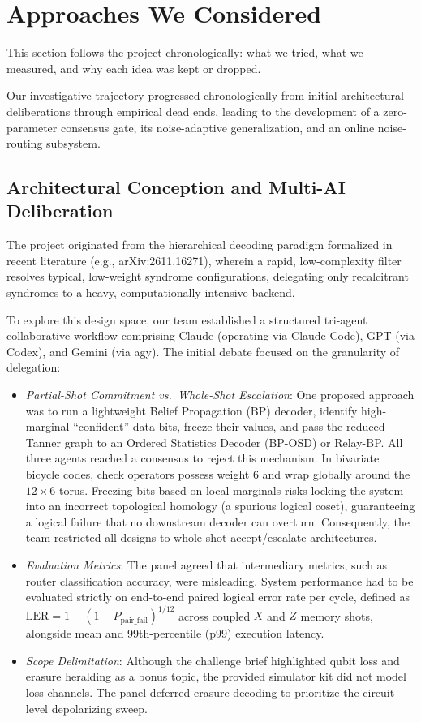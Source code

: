 \section{Approaches We Considered}

This section follows the project chronologically: what we tried, what we measured, and why each idea was kept or dropped.

Our investigative trajectory progressed chronologically from initial architectural deliberations through empirical dead ends, leading to the development of a zero-parameter consensus gate, its noise-adaptive generalization, and an online noise-routing subsystem.

\subsection{Architectural Conception and Multi-AI Deliberation}

The project originated from the hierarchical decoding paradigm formalized in recent literature (e.g., arXiv:2611.16271), wherein a rapid, low-complexity filter resolves typical, low-weight syndrome configurations, delegating only recalcitrant syndromes to a heavy, computationally intensive backend. 

To explore this design space, our team established a structured tri-agent collaborative workflow comprising Claude (operating via Claude Code), GPT (via Codex), and Gemini (via agy). The initial debate focused on the granularity of delegation:
\begin{itemize}
    \item \textit{Partial-Shot Commitment vs.\ Whole-Shot Escalation}: One proposed approach was to run a lightweight Belief Propagation (BP) decoder, identify high-marginal ``confident'' data bits, freeze their values, and pass the reduced Tanner graph to an Ordered Statistics Decoder (BP-OSD) or Relay-BP. All three agents reached a consensus to reject this mechanism. In bivariate bicycle codes, check operators possess weight 6 and wrap globally around the $12 \times 6$ torus. Freezing bits based on local marginals risks locking the system into an incorrect topological homology (a spurious logical coset), guaranteeing a logical failure that no downstream decoder can overturn. Consequently, the team restricted all designs to whole-shot accept/escalate architectures.
    \item \textit{Evaluation Metrics}: The panel agreed that intermediary metrics, such as router classification accuracy, were misleading. System performance had to be evaluated strictly on end-to-end paired logical error rate per cycle, defined as $\text{LER} = 1 - (1 - P_{\text{pair\_fail}})^{1/12}$ across coupled $X$ and $Z$ memory shots, alongside mean and 99th-percentile (p99) execution latency.
    \item \textit{Scope Delimitation}: Although the challenge brief highlighted qubit loss and erasure heralding as a bonus topic, the provided simulator kit did not model loss channels. The panel deferred erasure decoding to prioritize the circuit-level depolarizing sweep.
\end{itemize}

